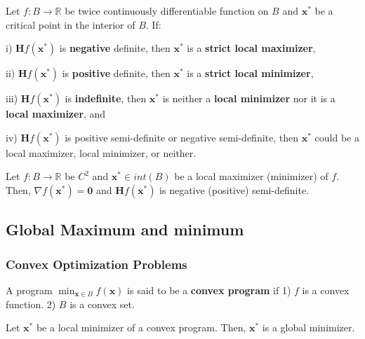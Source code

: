 \begin{proposition}
    Let \(f: B \to \mathbb{R}\) be twice continuously differentiable function on \(B\) and \(\mathbf{x}^{*}\) be a critical point in the interior of \(B\). If:

    i) \(\mathbf{H}f(\mathbf{x}^{*})\) is \textbf{negative} definite, then \(\mathbf{x}^{*}\) is a \textbf{strict local maximizer},

    ii) \(\mathbf{H}f(\mathbf{x}^{*})\) is \textbf{positive} definite, then \(\mathbf{x}^{*}\) is a \textbf{strict local minimizer},

    iii) \(\mathbf{H}f(\mathbf{x}^{*})\) is \textbf{indefinite}, then \(\mathbf{x}^{*}\) is neither a \textbf{local minimizer} nor it is a \textbf{local maximizer}, and

    iv) \(\mathbf{H}f(\mathbf{x}^{*})\) is positive semi-definite or negative semi-definite, then \(\mathbf{x}^{*}\) could be a local maximizer, local minimizer, or neither.
\end{proposition}

\begin{proposition}
    Let $f: B \to \mathbb{R}$ be $C ^{2}$ and $\mathbf{x ^{*}} \in int(B)$ be a local maximizer (minimizer) of $f$. Then, $\nabla f(\mathbf{x ^{*}}) = \mathbf{0}$ and $\mathbf{H}f(\mathbf{x ^{*}})$ is negative (positive) semi-definite.
\end{proposition}

\subsection{Global Maximum and minimum}

\subsubsection{Convex Optimization Problems}

\begin{definition}
    A program $\min_{\mathbf{x} \in B}f(\mathbf{x})$ is said to be a \textbf{convex program} if 1) $f$ is a convex function. 2) $B$ is a convex set.
\end{definition}

\begin{theorem}
    Let $\mathbf{x ^{*}}$ be a local minimizer of a convex program. Then, $\mathbf{x ^{*}}$ is a global minimizer.
\end{theorem}

